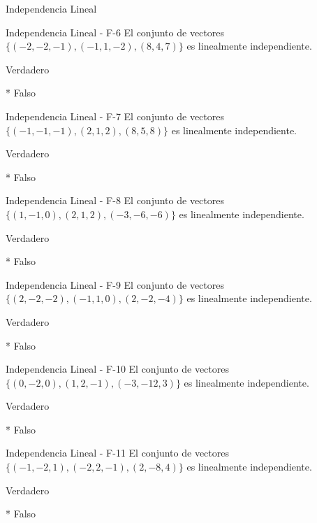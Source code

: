\documentclass[a4,11pt]{aleph-notas}
\begin{document}
\begin{quiz}{Independencia Lineal}
\begin{multi}[numbering = none, shuffle = false]%
    {Independencia Lineal - F-6}
    El conjunto de vectores $\{ (-2,-2,-1) , (-1,1,-2), (8, 4, 7) \}$ es linealmente independiente.
    \item[] Verdadero 
    \item[]* Falso
\end{multi}

\begin{multi}[numbering = none, shuffle = false]%
    {Independencia Lineal - F-7}
    El conjunto de vectores $\{ (-1,-1,-1) , (2,1,2), (8, 5, 8) \}$ es linealmente independiente.
    \item[] Verdadero 
    \item[]* Falso
\end{multi}

\begin{multi}[numbering = none, shuffle = false]%
    {Independencia Lineal - F-8}
    El conjunto de vectores $\{ (1,-1,0) , (2,1,2), (-3, -6, -6) \}$ es linealmente independiente.
    \item[] Verdadero 
    \item[]* Falso
\end{multi}

\begin{multi}[numbering = none, shuffle = false]%
    {Independencia Lineal - F-9}
    El conjunto de vectores $\{ (2,-2,-2) , (-1,1,0), (2, -2, -4) \}$ es linealmente independiente.
    \item[] Verdadero 
    \item[]* Falso
\end{multi}

\begin{multi}[numbering = none, shuffle = false]%
    {Independencia Lineal - F-10}
    El conjunto de vectores $\{ (0,-2,0) , (1,2,-1), (-3, -12, 3) \}$ es linealmente independiente.
    \item[] Verdadero 
    \item[]* Falso
\end{multi}

\begin{multi}[numbering = none, shuffle = false]%
    {Independencia Lineal - F-11}
    El conjunto de vectores $\{ (-1,-2,1) , (-2,2,-1), (2, -8, 4) \}$ es linealmente independiente.
    \item[] Verdadero 
    \item[]* Falso
\end{multi}


\end{quiz}
\end{document}
